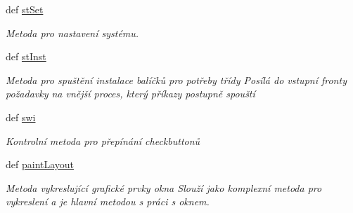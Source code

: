 \begin{DoxyCompactItemize}
def \hyperlink{classcloseSetup_1_1App_a371a8cb0f96f6960e4786c77975288f1}{st\-Set}
\begin{DoxyCompactList}\small\item\em Metoda pro nastavení systému. \end{DoxyCompactList}\item 
def \hyperlink{classcloseSetup_1_1App_abec84cf3637759925e510a5f66de1567}{st\-Inst}
\begin{DoxyCompactList}\small\item\em Metoda pro spuštění instalace balíčků pro potřeby třídy Posílá do vstupní fronty požadavky na vnější proces, který příkazy postupně spouští \end{DoxyCompactList}\item 
def \hyperlink{classcloseSetup_1_1App_ad423eb22965d036bfc941a3d1f5eefc0}{swi}
\begin{DoxyCompactList}\small\item\em Kontrolní metoda pro přepínání checkbuttonů \end{DoxyCompactList}\item 
def \hyperlink{classcloseSetup_1_1App_ac26a170acd7324f1667666842047a92b}{paint\-Layout}
\begin{DoxyCompactList}\small\item\em Metoda vykreslující grafické prvky okna Slouží jako komplexní metoda pro vykreslení a je hlavní metodou s práci s oknem. \end{DoxyCompactList}\end{DoxyCompactItemize}
